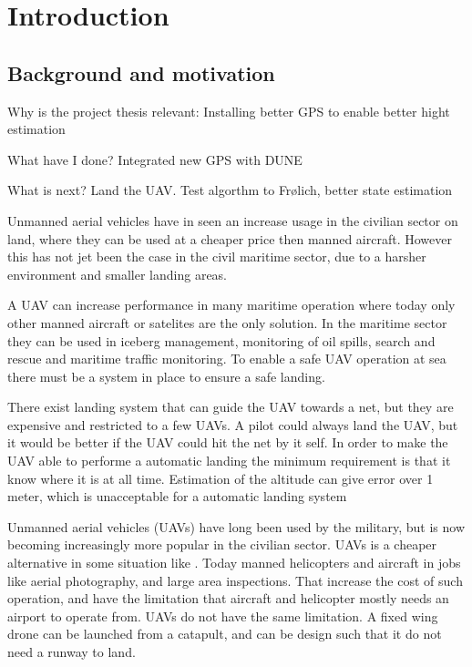 
\chapter{Introduction}

\section{Background and motivation}
Why is the project thesis relevant: Installing better GPS to enable better hight estimation

What have I done? Integrated new GPS with DUNE

What is next? Land the UAV. Test algorthm to Frølich, better state estimation 

Unmanned aerial vehicles have in seen an increase usage in the civilian sector on land, where they can be used at a cheaper price then manned aircraft. However this has not jet been the case in the civil maritime sector, due to a harsher environment and smaller landing areas.

A UAV can increase performance in many maritime operation where today only other manned aircraft or satelites are the only solution. In the maritime sector they can be used in iceberg management, monitoring of oil spills, search and rescue and maritime traffic monitoring. To enable a safe UAV operation at sea there must be a system in place to ensure a safe landing.

There exist landing system that can guide the UAV towards a net, but they are expensive and restricted to a few UAVs. A pilot could always land the UAV, but it would be better if the UAV could hit the net by it self. In order to make the UAV able to performe a automatic landing the minimum requirement is that it know where it is at all time. Estimation of the altitude can give error over 1 meter, which is unacceptable for a automatic landing system

Unmanned aerial vehicles (UAVs) have long been used by the military, but is now becoming increasingly more popular in the civilian sector. UAVs is a cheaper alternative in some situation like . Today manned helicopters and aircraft in jobs like aerial photography, and large area inspections. That increase the cost of such operation, and have the limitation that aircraft and helicopter mostly needs an airport to operate from. UAVs do not have the same limitation. A fixed wing drone can be launched from a catapult, and can be design such that it do not need a runway to land.

